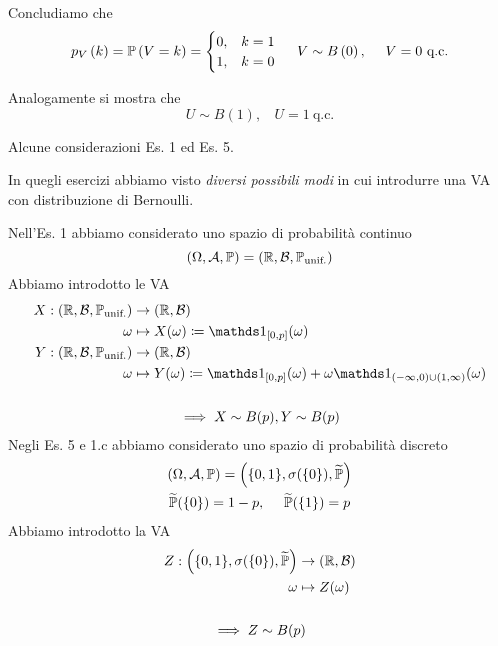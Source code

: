 \begin{enumerate}
Concludiamo che
\begin{equation*}
p_{V}\left( k\right) =\mathbb{P}\left( V=k\right) =\begin{cases}
0, & k=1\\
1, & k=0
\end{cases}
 \ \ \ \ V\sim B\left( 0\right) ,\ \ \ \ V=0\ \text{q.c.}
\end{equation*}

Analogamente si mostra che
\begin{equation*}
U\sim B( 1) ,\ \ \ \ U=1\ \text{q.c.}
\end{equation*}
\end{enumerate}
\begin{oss}
Alcune considerazioni Es. 1 ed Es. 5.

In quegli esercizi abbiamo visto \textit{diversi possibili modi} in cui introdurre una VA con distribuzione di Bernoulli.

Nell'Es. 1 abbiamo considerato uno spazio di probabilità continuo
\begin{equation*}
( \Omega ,\mathcal{A} ,\mathbb{P}) =(\mathbb{R} ,\mathcal{B} ,\mathbb{P}_{\text{unif.}})
\end{equation*}
Abbiamo introdotto le VA
\begin{gather*}
\begin{aligned}
X:(\mathbb{R} ,\mathcal{B} ,\PP_{\text{unif.}}) & \rightarrow (\mathbb{R} ,\mathcal{B})\\
\omega  & \mapsto X( \omega ) \coloneqq \Ind_{[ 0,p]}( \omega )\\
Y:(\mathbb{R} ,\mathcal{B} ,\PP_{\text{unif.}}) & \rightarrow (\mathbb{R} ,\mathcal{B})\\
\omega  & \mapsto Y( \omega ) \coloneqq \Ind_{[ 0,p]}( \omega ) +\omega \Ind_{( -\infty ,0) \cup ( 1,\infty )}( \omega )
\end{aligned}\\
\ \\
\implies X\sim B( p) ,Y\sim B( p)
\end{gather*}
Negli Es. 5 e 1.c abbiamo considerato uno spazio di probabilità discreto
\begin{gather*}
( \Omega ,\mathcal{A} ,\mathbb{P}) =\left(\{0,1\} ,\sigma (\{0\}) ,\widetilde{\mathbb{P}}\right)\\
\widetilde{\mathbb{P}}(\{0\}) =1-p,\ \ \ \ \widetilde{\mathbb{P}}(\{1\}) =p
\end{gather*}
Abbiamo introdotto la VA
\begin{gather*}
\begin{aligned}
Z:\left(\{0,1\} ,\sigma (\{0\}) ,\widetilde{\mathbb{P}}\right) & \rightarrow (\mathbb{R} ,\mathcal{B})\\
\omega  & \mapsto Z( \omega )
\end{aligned}\\
\\
\implies Z\sim B( p)
\end{gather*}
\end{oss}
\Soluzione

